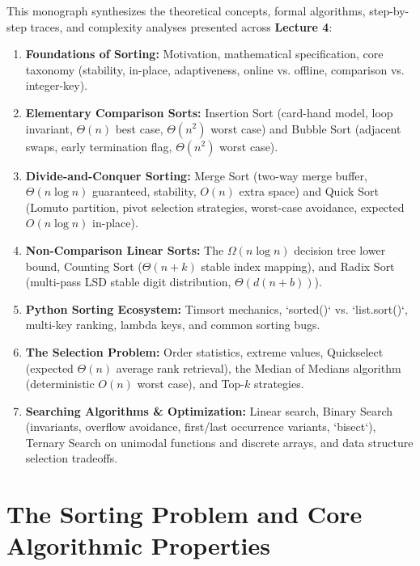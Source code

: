 \documentclass[11pt,a4paper]{article}
\begin{document}
\begin{notebox}
This monograph synthesizes the theoretical concepts, formal algorithms, step-by-step traces, and complexity analyses presented across \textbf{Lecture 4}:
\begin{enumerate}[itemsep=1pt,topsep=2pt]
    \item \textbf{Foundations of Sorting:} Motivation, mathematical specification, core taxonomy (stability, in-place, adaptiveness, online vs. offline, comparison vs. integer-key).
    \item \textbf{Elementary Comparison Sorts:} Insertion Sort (card-hand model, loop invariant, $\Theta(n)$ best case, $\Theta(n^2)$ worst case) and Bubble Sort (adjacent swaps, early termination flag, $\Theta(n^2)$ worst case).
    \item \textbf{Divide-and-Conquer Sorting:} Merge Sort (two-way merge buffer, $\Theta(n \log n)$ guaranteed, stability, $O(n)$ extra space) and Quick Sort (Lomuto partition, pivot selection strategies, worst-case avoidance, expected $O(n \log n)$ in-place).
    \item \textbf{Non-Comparison Linear Sorts:} The $\Omega(n \log n)$ decision tree lower bound, Counting Sort ($\Theta(n+k)$ stable index mapping), and Radix Sort (multi-pass LSD stable digit distribution, $\Theta(d(n+b))$).
    \item \textbf{Python Sorting Ecosystem:} Timsort mechanics, `sorted()` vs. `list.sort()`, multi-key ranking, lambda keys, and common sorting bugs.
    \item \textbf{The Selection Problem:} Order statistics, extreme values, Quickselect (expected $\Theta(n)$ average rank retrieval), the Median of Medians algorithm (deterministic $O(n)$ worst case), and Top-$k$ strategies.
    \item \textbf{Searching Algorithms \& Optimization:} Linear search, Binary Search (invariants, overflow avoidance, first/last occurrence variants, `bisect`), Ternary Search on unimodal functions and discrete arrays, and data structure selection tradeoffs.
\end{enumerate}
\end{notebox}

\tableofcontents
\newpage

\section{The Sorting Problem and Core Algorithmic Properties}
\end{document}
